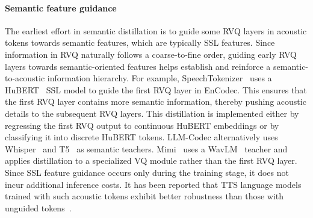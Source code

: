 \paragraph{Semantic feature guidance} 
The earliest effort in semantic distillation is to guide some RVQ layers in acoustic tokens towards semantic features, which are typically SSL features. 
Since information in RVQ naturally follows a coarse-to-fine order, guiding early RVQ layers towards semantic-oriented features helps establish and reinforce a semantic-to-acoustic information hierarchy.
For example, SpeechTokenizer~\cite{zhang2024speechtokenizer} uses a HuBERT~\cite{hsu2021hubert} SSL model to guide the first RVQ layer in EnCodec.
This ensures that the first RVQ layer contains more semantic information, thereby pushing acoustic details to the subsequent RVQ layers. 
This distillation is implemented either by regressing the first RVQ output to continuous HuBERT embeddings or by classifying it into discrete HuBERT tokens.
LLM-Codec alternatively uses Whisper~\cite{whisper} and T5~\cite{raffel2020exploring} as semantic teachers.
Mimi~\cite{kyutai2024moshi} uses a WavLM~\cite{chen2022wavlm} teacher and applies distillation to a specialized VQ module rather than the first RVQ layer.
Since SSL feature guidance occurs only during the training stage, it does not incur additional inference costs.
It has been reported that TTS language models trained with such acoustic tokens exhibit better robustness than those with unguided tokens~\cite{zhang2024speechtokenizer}.

